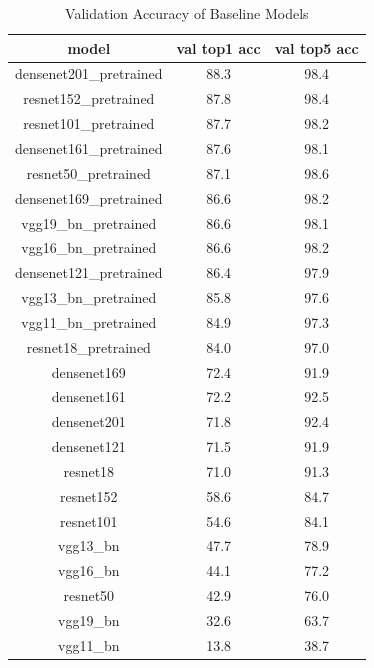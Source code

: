 \begin{table}
  \centering
  \caption{Validation Accuracy of Baseline Models}
  \label{tabel:val_acc}
  \begin{tabular}{ccc}
    \hline
    \toprule
    model                   & val top1 acc       & val top5 acc      \\
    \midrule  %

    densenet201\_pretrained & 88.3 & 98.4 \\
    resnet152\_pretrained   & 87.8 & 98.4 \\
    resnet101\_pretrained   & 87.7 & 98.2 \\
    densenet161\_pretrained & 87.6 & 98.1 \\
    resnet50\_pretrained    & 87.1 & 98.6 \\
    densenet169\_pretrained & 86.6 & 98.2 \\
    vgg19\_bn\_pretrained   & 86.6 & 98.1 \\
    vgg16\_bn\_pretrained   & 86.6 & 98.2 \\
    densenet121\_pretrained & 86.4 & 97.9 \\
    vgg13\_bn\_pretrained   & 85.8 & 97.6 \\
    vgg11\_bn\_pretrained   & 84.9 & 97.3 \\
    resnet18\_pretrained    & 84.0 & 97.0 \\
    densenet169             & 72.4 & 91.9 \\
    densenet161             & 72.2 & 92.5 \\
    densenet201             & 71.8 & 92.4 \\
    densenet121             & 71.5 & 91.9 \\
    resnet18                & 71.0 & 91.3 \\
    resnet152               & 58.6 & 84.7 \\
    resnet101               & 54.6 & 84.1 \\
    vgg13\_bn               & 47.7 & 78.9 \\
    vgg16\_bn               & 44.1 & 77.2 \\
    resnet50                & 42.9 & 76.0 \\
    vgg19\_bn               & 32.6 & 63.7 \\
    vgg11\_bn               & 13.8 & 38.7 \\
    \bottomrule
  \end{tabular}
\end{table}

